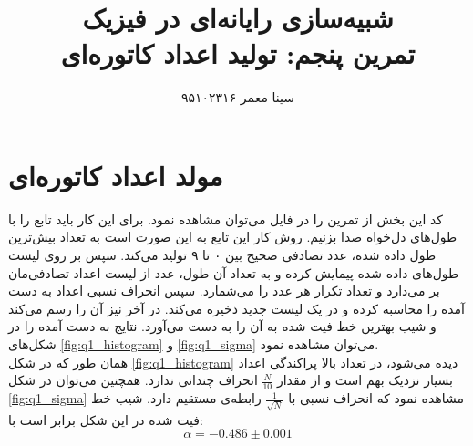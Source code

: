 \documentclass[11pt, a4paper]{article}
\title{\textbf{شبیه‌سازی رایانه‌ای در فیزیک}\\تمرین پنجم: تولید اعداد کاتوره‌ای}
\author{سینا معمر ۹۵۱۰۲۳۱۶}
\begin{document}
\maketitle
\thispagestyle{empty}


\section{\textbf{مولد اعداد کاتوره‌ای}}
کد این بخش از تمرین را در فایل
می‌توان مشاهده نمود.
برای این کار‌ باید تابع
را با طول‌های دل‌خواه صدا بزنیم.
روش کار این تابع به این صورت است به تعداد بیش‌ترین طول داده شده، عدد تصادفی صحیح بین ۰ تا ۹ تولید می‌کند.
سپس بر روی لیست طول‌های داده شده پیمایش کرده و به تعداد آن طول، عدد از لیست اعداد تصادفی‌مان
بر می‌دارد و تعداد تکرار هر عدد را می‌شمارد.
سپس انحراف نسبی اعداد به دست‌ آمده را محاسبه کرده و در یک لیست جدید ذخیره می‌کند.
در آخر نیز آن را رسم می‌کند و شیب بهترین خط فیت شده به آن را به دست می‌آورد.
نتایج به دست آمده را در شکل‌های
\ref{fig:q1_histogram}
و
\ref{fig:q1_sigma}
می‌توان مشاهده نمود.
\\
همان طور که در شکل‌
\ref{fig:q1_histogram}
دیده می‌شود، در تعداد بالا پراکندگی اعداد بسیار نزدیک بهم است و از مقدار
$\frac{N}{10}$
انحراف چندانی ندارد.
همچنین می‌توان در شکل‌
\ref{fig:q1_sigma}
مشاهده نمود که انحراف نسبی با 
$\frac{1}{\sqrt{N}}$
رابطه‌ی مستقیم دارد. شیب خط فیت شده در این شکل برابر است با:
\begin{equation}
  \alpha = -0.486 \pm 0.001
\end{equation}
\end{document}

